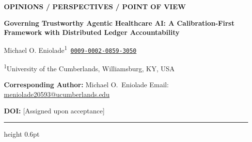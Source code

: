 \documentclass[12pt,a4paper]{article}
\date{}
\begin{document}
\thispagestyle{empty}

\begin{center}
  {\fontsize{10}{12}\selectfont\bfseries\color{bhtyblue}
   OPINIONS / PERSPECTIVES / POINT OF VIEW}
\end{center}

\vspace{6pt}

\begin{center}
  {\fontsize{16}{20}\selectfont\bfseries
   Governing Trustworthy Agentic Healthcare AI: A
   Calibration-First Framework with Distributed Ledger
   Accountability}
\end{center}

\vspace{10pt}

\begin{center}
  {\fontsize{12}{14}\selectfont
  Michael O. Eniolade\textsuperscript{1}%
  \,\href{https://orcid.org/0009-0002-0859-3050}{\texttt{0009-0002-0859-3050}}%
  }
\end{center}

\begin{center}
  {\fontsize{10}{12}\selectfont
  \textsuperscript{1}University of the Cumberlands,
  Williamsburg, KY, USA}
\end{center}

\vspace{4pt}
\begin{center}
  {\fontsize{10}{12}\selectfont
  \textbf{Corresponding Author:} Michael O.~Eniolade \quad
  Email: \href{mailto:meniolade20593@ucumberlands.edu}%
  {meniolade20593@ucumberlands.edu}}
\end{center}

\vspace{4pt}
\begin{center}
  {\fontsize{10}{12}\selectfont
  \textbf{DOI:} [Assigned upon acceptance]}
\end{center}

\vspace{8pt}


\vspace{10pt}
\hrule height 0.6pt
\vspace{10pt}
\end{document}

